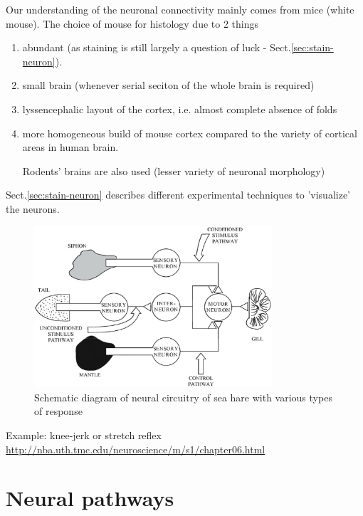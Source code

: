 Our understanding of the neuronal connectivity mainly comes from mice (white
mouse). The choice of mouse for histology due to 2 things
\begin{enumerate}
  \item abundant (as staining is still largely a question of luck -
  Sect.\ref{sec:stain-neuron}).
  
  \item small brain (whenever serial seciton of the whole brain is required)
  
  \item lyssencephalic layout of the cortex, i.e. almost complete absence of
  folds
  
  \item more homogeneous build of mouse cortex compared to the variety of
  cortical areas in human brain.
  
Rodents' brains are also used (lesser variety of neuronal morphology)
\end{enumerate}
Sect.\ref{sec:stain-neuron} describes different experimental techniques to
'visualize' the neurons.



\begin{figure}[htb]
  \centerline{\includegraphics[height=6cm]{./images/parallel_neurons.eps}}
  \caption{Schematic diagram of neural circuitry of sea hare with
    various types of response}\label{fig:neural_circuitry_sea-hare}
\end{figure}

Example: knee-jerk
or stretch reflex \url{http://nba.uth.tmc.edu/neuroscience/m/s1/chapter06.html}



\section{Neural pathways}

